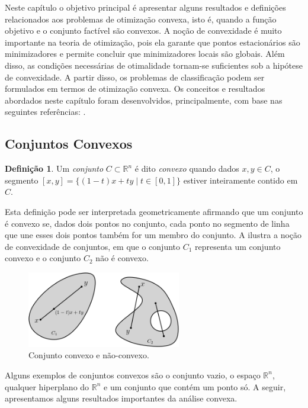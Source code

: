 \documentclass[12pt,a4paper]{scrartcl}
\def\RR{\mathds{R}}
\theoremstyle{definition}%
\newtheorem{defi}{Definição}
\begin{document}
Neste capítulo o objetivo principal é apresentar alguns resultados e definições relacionados aos problemas de otimização convexa, isto é, quando a função objetivo e o conjunto factível são convexos. A noção de convexidade é muito importante na teoria de otimização, pois ela garante que pontos estacionários são minimizadores e permite concluir que minimizadores locais são globais. Além disso, as condições necessárias de otimalidade tornam-se suficientes sob a hipótese de convexidade. A partir disso, os problemas de classificação podem ser formulados em termos de otimização convexa. Os conceitos e resultados abordados neste capítulo foram desenvolvidos, principalmente, com base nas seguintes referências: \textcite{Evelin2017,Ademir2013,Izmailov2014ac}.

\subsection{Conjuntos Convexos}

\begin{defi} 
Um \emph{conjunto} $C \subset \RR^{n}$ é dito \emph{convexo} quando dados $x,y \in C$, o segmento $[x,y] = \{ (1-t)x + ty \mid t\in [0,1] \}$ estiver inteiramente contido em $C$.
\end{defi}

Esta definição pode ser interpretada geometricamente afirmando que um conjunto é convexo se, dados dois pontos no conjunto, cada ponto no segmento de linha que une esses dois pontos também for um membro do conjunto. A  ilustra a noção de convexidade de conjuntos, em que o conjunto $C_{1}$ representa um conjunto convexo e o conjunto $C_{2}$ não é convexo.


\begin{figure}[!ht] 
	\centering
	\includegraphics[width=0.60\textwidth]{conjuntos_convexo_naoconvexo}
	\caption{ Conjunto convexo e não-convexo. \label{fig:conjuntos_convexos}}
\end{figure}


Alguns exemplos de conjuntos convexos são o conjunto vazio, o espaço $\RR^{n}$, qualquer hiperplano do $\RR^{n}$ e um conjunto que contém um ponto só. A seguir, apresentamos alguns resultados importantes da análise convexa.
\end{document}
